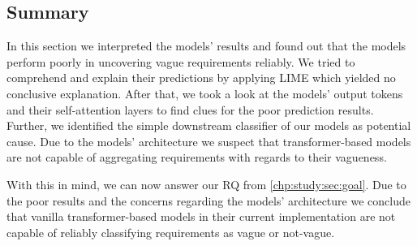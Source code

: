 \subsection{Summary}
\label{chp:study:sec:interpretation:subsec:summary}
In this section we interpreted the models' results and found out that the models perform poorly in uncovering vague requirements reliably.
We tried to comprehend and explain their predictions by applying \ac{LIME} which yielded no conclusive explanation.
After that, we took a look at the models' output tokens and their self-attention layers to find clues for the poor prediction results.
Further, we identified the simple downstream classifier of our models as potential cause.
Due to the models' architecture we suspect that transformer-based models are not capable of aggregating requirements with regards to their vagueness.

With this in mind, we can now answer our \ac{RQ} from \cref{chp:study:sec:goal}.
Due to the poor results and the concerns regarding the models' architecture we conclude that vanilla transformer-based models in their current implementation are not capable of reliably classifying requirements as vague or not-vague.
